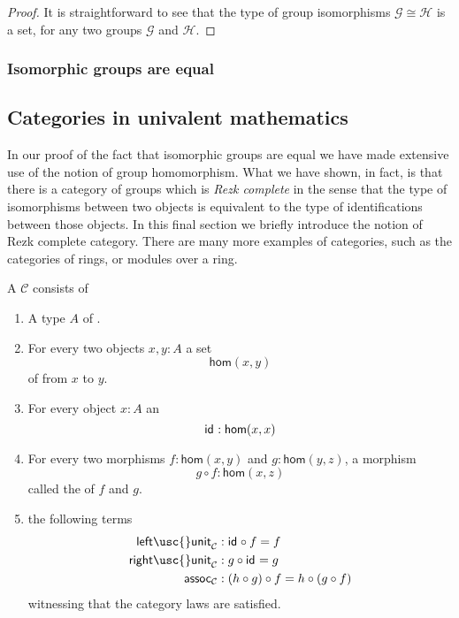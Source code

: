 \begin{proof}
It is straightforward to see that the type of group isomorphisms $\mathcal{G}\cong\mathcal{H}$ is a set, for any two groups $\mathcal{G}$ and $\mathcal{H}$.
\end{proof}

\subsubsection{Isomorphic groups are equal}

\subsection{Categories in univalent mathematics}

In our proof of the fact that isomorphic groups are equal we have made extensive use of the notion of group homomorphism. What we have shown, in fact, is that there is a category of groups which is \emph{Rezk complete} in the sense that the type of isomorphisms between two objects is equivalent to the type of identifications between those objects. In this final section we briefly introduce the notion of Rezk complete category. There are many more examples of categories, such as the categories of rings, or modules over a ring.

\begin{defn}
  A  $\mathcal{C}$ consists of
  \begin{enumerate}
  \item A type $A$ of .
  \item For every two objects $x,y:A$ a set
    \begin{equation*}
      \mathsf{hom}(x,y)
    \end{equation*}
    of  from $x$ to $y$.
  \item For every object $x:A$ an 
    \begin{equation*}
      \mathsf{id}_{} : \mathsf{hom}(x,x)
    \end{equation*}
  \item For every two morphisms $f:\mathsf{hom}(x,y)$ and $g:\mathsf{hom}(y,z)$, a morphism
    \begin{equation*}
      g\circ f :\mathsf{hom}(x,z)
    \end{equation*}
    called the  of $f$ and $g$.
  \item the following terms
    \begin{align*}
      \mathsf{left\usc{}unit}_{\mathcal{C}} & : \idfunc \circ f = f \\
      \mathsf{right\usc{}unit}_{\mathcal{C}} & : g \circ \idfunc = g \\
      \mathsf{assoc}_{\mathcal{C}} & : (h \circ g) \circ f = h \circ (g \circ f)
    \end{align*}
    witnessing that the category laws are satisfied.
  \end{enumerate}
\end{defn}

